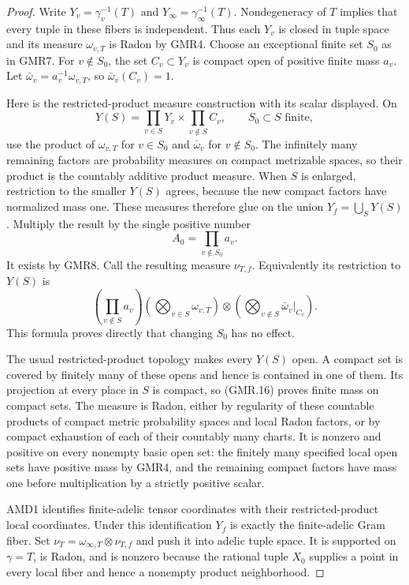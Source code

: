 \begin{proof}
Write $Y_v=\gamma_v^{-1}(T)$ and $Y_\infty=\gamma_\infty^{-1}(T)$.
Nondegeneracy of $T$ implies that every tuple in these fibers is
independent.  Thus each $Y_v$ is closed in tuple space and its measure
$\omega_{v,T}$ is Radon by GMR4.  Choose an exceptional finite set
$S_0$ as in GMR7.  For $v\notin S_0$, the set $C_v\subset Y_v$ is
compact open of positive finite mass $a_v$.  Let
$\bar\omega_v=a_v^{-1}\omega_{v,T}$, so
$\bar\omega_v(C_v)=1$.

Here is the restricted-product measure construction with its scalar
displayed.  On
\[
 Y(S)=\prod_{v\in S}Y_v\times\prod_{v\notin S}C_v,
       \qquad S_0\subset S\text{ finite},
\]
use the product of $\omega_{v,T}$ for $v\in S_0$ and
$\bar\omega_v$ for $v\notin S_0$.  The infinitely many remaining
factors are probability measures on compact metrizable spaces, so
their product is the countably additive product measure.  When $S$
is enlarged, restriction to the smaller $Y(S)$ agrees, because the
new compact factors have normalized mass one.  These measures
therefore glue on the union $Y_f=\bigcup_SY(S)$.  Multiply the result
by the single positive number
\[
 A_0=\prod_{v\notin S_0}a_v.
 \tag{GMR.15}
\]
It exists by GMR8.  Call the resulting measure $\nu_{T,f}$.
Equivalently its restriction to $Y(S)$ is
\[
 \left(\prod_{v\notin S}a_v\right)
 \left(\bigotimes_{v\in S}\omega_{v,T}\right)
 \otimes\left(\bigotimes_{v\notin S}\bar\omega_v|_{C_v}\right).
 \tag{GMR.16}
\]
This formula proves directly that changing $S_0$ has no effect.

The usual restricted-product topology makes every $Y(S)$ open.
A compact set is covered by finitely many of these opens and hence
is contained in one of them.  Its projection at every place in $S$
is compact, so (GMR.16) proves finite mass on compact sets.  The
measure is Radon, either by regularity of these countable products
of compact metric probability spaces and local Radon factors, or by
compact exhaustion of each of their countably many charts.
It is nonzero and positive on every nonempty basic open set: the
finitely many specified local open sets have positive mass by GMR4,
and the remaining compact factors have mass one before multiplication
by a strictly positive scalar.

AMD1 identifies finite-adelic tensor coordinates with their
restricted-product local coordinates.  Under this identification
$Y_f$ is exactly the finite-adelic Gram fiber.  Set
$\nu_T=\omega_{\infty,T}\otimes\nu_{T,f}$ and push it into adelic
tuple space.  It is supported on $\gamma=T$, is Radon, and is nonzero
because the rational tuple $X_0$ supplies a point in every local
fiber and hence a nonempty product neighborhood.


\end{proof}
